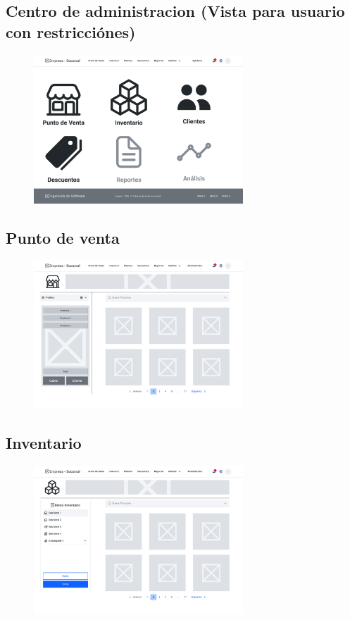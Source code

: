 \documentclass{article}
\begin{document}
\subsection{Centro de administracion (Vista para usuario con restricci\'ones)}
\begin{figure}[h]
\centering
\includegraphics[width=0.7\textwidth]{wireframe/Centro Ayudante.png}
\end{figure}

\newpage
\subsection{Punto de venta}
\begin{figure}[h]
\centering
\includegraphics[width=0.7\textwidth]{wireframe/Punto de Venta.png}
\end{figure}

\subsection{Inventario}
\begin{figure}[h]
\centering
\includegraphics[width=0.7\textwidth]{wireframe/Inventario.png}
\end{figure}
\end{document}
